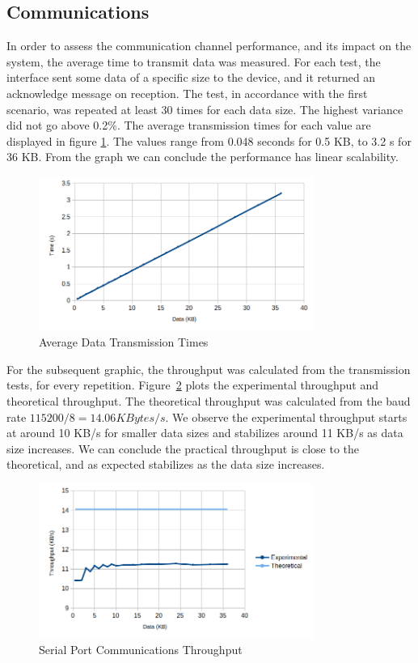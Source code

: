 \subsection{Communications}\label{chap:evaluation:performance:comms}

In order to assess the communication channel performance, and its impact on the system, the average time to transmit data was measured. For each test, the interface sent some data of a specific size to the device, and it returned an acknowledge message on reception. The test, in accordance with the first scenario, was repeated at least 30 times for each data size. The highest variance did not go above 0.2\%.
The average transmission times for each value are displayed in figure \ref{fig:comms:time}.
The values range from 0.048 seconds for 0.5 KB, to 3.2 s for 36 KB.
From the graph we can conclude the performance has linear scalability.

\begin{figure}[h!]
	\centering
	\includegraphics[width=0.8\textwidth]{./Images/comms-time.png}
	\caption{Average Data Transmission Times}
	\label{fig:comms:time}
\end{figure}

For the subsequent graphic, the throughput was calculated from the transmission tests, for every repetition.
Figure~\ref{fig:comms:tput} plots the experimental throughput and theoretical throughput. The theoretical throughput was calculated from the baud rate \(115200/8 = 14.06 KBytes/s\).
We observe the experimental throughput starts at around 10 KB/s for smaller data sizes and stabilizes around 11 KB/s as data size increases.
We can conclude the practical throughput is close to the theoretical, and as expected stabilizes as the data size increases.

\begin{figure}[h!]
	\centering
	\includegraphics[width=0.8\textwidth]{./Images/comms-tput.png}
	\caption{Serial Port Communications Throughput}
	\label{fig:comms:tput}
\end{figure}

